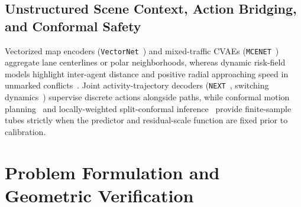 \documentclass[journal]{IEEEtran}
\begin{document}
\subsection{Unstructured Scene Context, Action Bridging, and Conformal Safety}
Vectorized map encoders (\texttt{VectorNet}~\cite{gao2020vectornet}) and mixed-traffic CVAEs (\texttt{MCENET}~\cite{cheng2020mcenet}) aggregate lane centerlines or polar neighborhoods, whereas dynamic risk-field models highlight inter-agent distance and positive radial approaching speed in unmarked conflicts~\cite{wu2024riskfield}. Joint activity-trajectory decoders (\texttt{NEXT}~\cite{liang2019next}, switching dynamics~\cite{kooij2019switching}) supervise discrete actions alongside paths, while conformal motion planning~\cite{lindemann2023conformal} and locally-weighted split-conformal inference~\cite{lei2018conformal} provide finite-sample tubes strictly when the predictor and residual-scale function are fixed prior to calibration.

\section{Problem Formulation and Geometric Verification}
\end{document}
